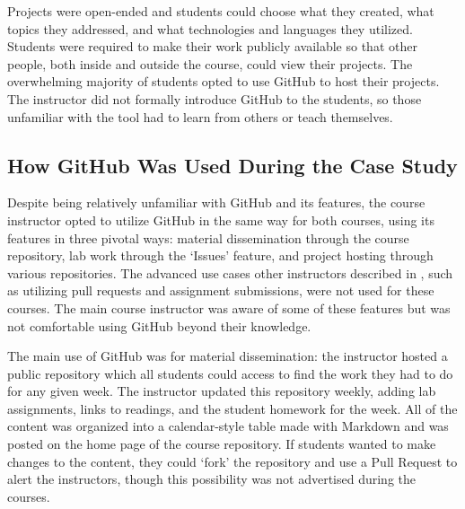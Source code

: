 Projects were open-ended and students could choose what they created, what topics they addressed, and what technologies and languages they utilized. Students were required to make their work publicly available so that other people, both inside and outside the course, could view their projects. The overwhelming majority of students opted to use GitHub to host their projects. The instructor did not formally introduce GitHub to the students, so those unfamiliar with the tool had to learn from others or teach themselves.

\subsection{How GitHub Was Used During the Case Study}
Despite being relatively unfamiliar with GitHub and its features, the course instructor opted to utilize GitHub in the same way for both courses, using its features in three pivotal ways: material dissemination through the course repository, lab work through the `Issues' feature, and project hosting through various repositories. The advanced use cases other instructors described in \cite{zagalsky2015emergence}, such as utilizing pull requests and assignment submissions, were not used for these courses. The main course instructor was aware of some of these features but was not comfortable using GitHub beyond their knowledge.

The main use of GitHub was for material dissemination: the instructor hosted a public repository which all students could access to find the work they had to do for any given week. The instructor updated this repository weekly, adding lab assignments, links to readings, and the student homework for the week. All of the content was organized into a calendar-style table made with Markdown and was posted on the home page of the course repository. If students wanted to make changes to the content, they could `fork' the repository and use a Pull Request to alert the instructors, though this possibility was not advertised during the courses.

